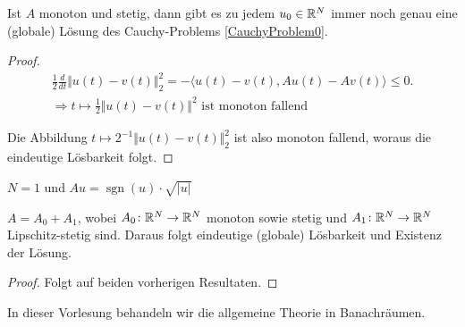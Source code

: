 \begin{lemma}
	Ist $A$ monoton und stetig, dann gibt es zu jedem $u_0\in\mathbb{R}^N$ immer noch genau eine (globale) Lösung des Cauchy-Problems \eqref{CauchyProblem0}.
\end{lemma}

\begin{proof}
	\begin{align*}
		\frac{1}{2}\frac{d}{dt}\Vert u(t)-v(t)\Vert_2^2=-\langle u(t)-v(t),Au(t)-Av(t)\rangle\leq 0.\\
		\Longrightarrow t\mapsto\frac{1}{2}\Vert u(t)-v(t)\Vert^2\text{ ist monoton fallend}
	\end{align*}

	Die Abbildung $t\mapsto 2^{-1}\Vert u(t)-v(t)\Vert_2^2$ ist also monoton fallend, woraus die eindeutige Lösbarkeit folgt. 
\end{proof}

\begin{beispiel}
	$N=1$ und $Au=\operatorname{sgn}(u)\cdot\sqrt{\vert u\vert}$
\end{beispiel}

\begin{korollar}\enter
	$A=A_0+A_1$, wobei $A_0\colon\mathbb{R}^N\to\mathbb{R}^N$ monoton sowie stetig und $A_1\colon\mathbb{R}^N\to\mathbb{R}^N$ Lipschitz-stetig sind. 
	Daraus folgt eindeutige (globale) Lösbarkeit und Existenz der Lösung.
\end{korollar}

\begin{proof}
	Folgt auf beiden vorherigen Resultaten.
\end{proof}

In dieser Vorlesung behandeln wir die allgemeine Theorie in Banachräumen.
